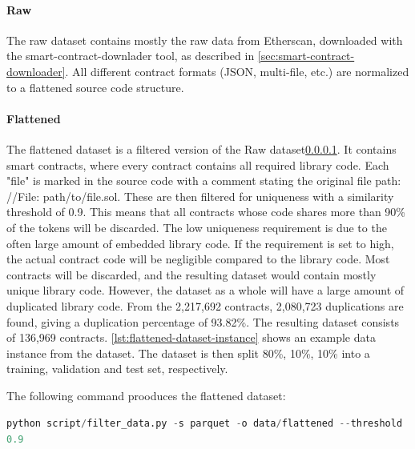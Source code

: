 \paragraph{Raw}
\label{sec:verified-smart-contracts-raw}
The raw dataset contains mostly the raw data from Etherscan, downloaded with the smart-contract-downlader tool, as described in \cref{sec:smart-contract-downloader}. All different contract formats (JSON, multi-file, etc.) are normalized to a flattened source code structure. 


\paragraph{Flattened}
\label{sec:verified-smart-contracts-flattened}

The flattened dataset is a filtered version of the Raw dataset\cref{sec:verified-smart-contracts-raw}. It contains smart contracts, where every contract contains all required library code. Each "file" is marked in the source code with a comment stating the original file path: //File: path/to/file.sol. These are then filtered for uniqueness with a similarity threshold of 0.9. This means that all contracts whose code shares more than 90\% of the tokens will be discarded. The low uniqueness requirement is due to the often large amount of embedded library code. If the requirement is set to high, the actual contract code will be negligible compared to the library code. Most contracts will be discarded, and the resulting dataset would contain mostly unique library code. However, the dataset as a whole will have a large amount of duplicated library code. From the 2,217,692 contracts, 2,080,723 duplications are found, giving a duplication percentage of 93.82\%. The resulting dataset consists of 136,969 contracts. \cref{lst:flattened-dataset-instance} shows an example data instance from the dataset. The dataset is then split 80\%, 10\%, 10\% into a training, validation and test set, respectively.


The following command prooduces the flattened dataset:

\lstinline[language=Python]!python script/filter_data.py -s parquet -o data/flattened --threshold 0.9!


